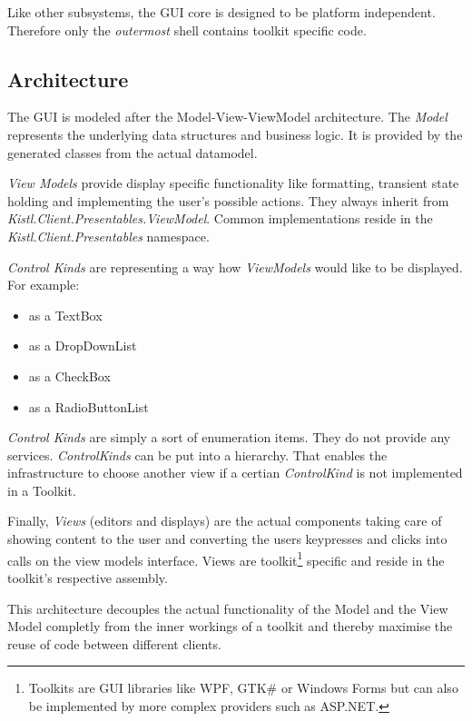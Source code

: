 Like other subsystems, the GUI core is designed to be platform
independent. Therefore only the \emph{outermost} shell contains toolkit
specific code.

\subsection{Architecture}

The GUI is modeled after the Model-View-ViewModel architecture. The
\emph{Model} represents the underlying data structures and business
logic. It is provided by the generated classes from the actual
datamodel. 

\emph{View Models} provide
display specific functionality like formatting, transient state holding
and implementing the user's possible actions. They always inherit from
\emph{Kistl.Client.Presentables.ViewModel}.
Common implementations reside in the
\emph{Kistl.Client.Presentables} namespace.

\emph{Control Kinds} are representing a way how \emph{ViewModels} would like to be displayed. For example:

\begin{itemize}
\item as a TextBox
\item as a DropDownList
\item as a CheckBox
\item as a RadioButtonList
\end{itemize}

\emph{Control Kinds} are simply a sort of enumeration items. They do not provide any services. 
\emph{ControlKinds} can be put into a hierarchy. That enables the infrastructure to choose another view if a certian 
\emph{ControlKind} is not implemented in a Toolkit.
 
Finally,
\emph{Views} (editors and displays) are the actual components taking
care of showing content to the user and converting the users keypresses
and clicks into calls on the view models interface.  Views are
toolkit\footnote{Toolkits are GUI libraries like WPF, GTK\# or Windows
Forms but can also be implemented by more complex providers such as
ASP.NET.} specific and reside in the toolkit's respective assembly.

This architecture decouples the actual functionality of the Model and
the View Model completly from the inner workings of a toolkit and
thereby maximise the reuse of code between different clients.

